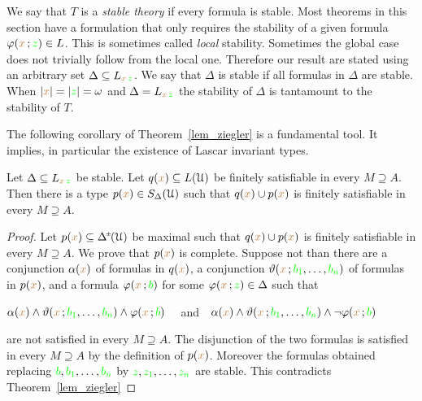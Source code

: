 \def\ceq#1#2#3{\parbox{20ex}{$\displaystyle #1$}\medrel{#2}$\displaystyle  #3$}

We say that $T$ is a \emph{stable theory\/} if every formula is stable.
Most theorems in this section have a formulation that only requires the stability of a given formula $\varphi({\color{brown} x}\,;{\color{green} z})\in L$.
This is sometimes called \textit{local\/} stability.
Sometimes the global case does not trivially follow from the local one.
Therefore our result are stated using an arbitrary set $\Delta\subseteq L_{{\color{brown} x}\,{\color{green} z}}$.
We say that $\Delta$ is stable if all formulas in $\Delta$ are stable.
When $|{\color{brown} x}|=|{\color{green} z}|=\omega$ and $\Delta=L_{{\color{brown} x}\,{\color{green} z}}$ the stability of $\Delta$ is tantamount to the stability of $T$.

The following corollary of Theorem~\ref{lem_ziegler} is a fundamental tool.
It implies, in particular the existence of Lascar invariant types.

\begin{corollary}\label{corol_stable_coheir_over_models}
  Let  $\Delta\subseteq L_{{\color{brown} x}\,{\color{green} z}}$ be stable.
  Let $q({\color{brown} x})\subseteq L(\EuScript U)$ be finitely satisfiable in every $M\supseteq A$.
  Then there is a type $p({\color{brown} x})\in S_\Delta(\EuScript U)$ such that $q({\color{brown} x})\cup p({\color{brown} x})$ is finitely satisfiable in every $M\supseteq A$.
\end{corollary}

\begin{proof}
  Let $p({\mr x})\subseteq \pmDelta(\U)$ be maximal such that $q({\color{brown} x})\cup p({\color{brown} x})$ is finitely satisfiable in every $M\supseteq A$.
  We prove that $p({\color{brown} x})$ is complete.
  Suppose not than there are a conjunction $\alpha({\color{brown} x})$ of formulas in $q({\color{brown} x})$, a conjunction $\vartheta({\color{brown} x}\,;{\color{green} b_1},\dots,{\color{green} b_n})$ of formulas in $p({\color{brown} x})$, and a formula $\varphi({\color{brown} x}\,;{\color{green} b})$ for some $\varphi({\color{brown} x}\,;{\color{green} z})\in\Delta$ such that 

  \hfil$\alpha({\color{brown} x})\wedge\vartheta({\color{brown} x}\,;{\color{green} b_1},\dots,{\color{green} b_n})\wedge\varphi({\color{brown} x}\,;{\color{green} b})$ \ \ and\ \   $\alpha({\color{brown} x})\wedge\vartheta({\color{brown} x}\,;{\color{green} b_1},\dots,{\color{green} b_n})\wedge\neg\varphi({\color{brown} x}\,;{\color{green} b})$ 
 
  are not satisfied in every $M\supseteq A$.
  The disjunction of the two formulas is satisfied in every $M\supseteq A$ by the definition of $p({\color{brown} x})$.
  Moreover the formulas obtained replacing ${\color{green} b},{\color{green} b_1},\dots,{\color{green} b_n}$ by ${\color{green} z},{\color{green} z_1},\dots,{\color{green} z_n}$ are stable.
  This contradicts Theorem~\ref{lem_ziegler}
\end{proof}


